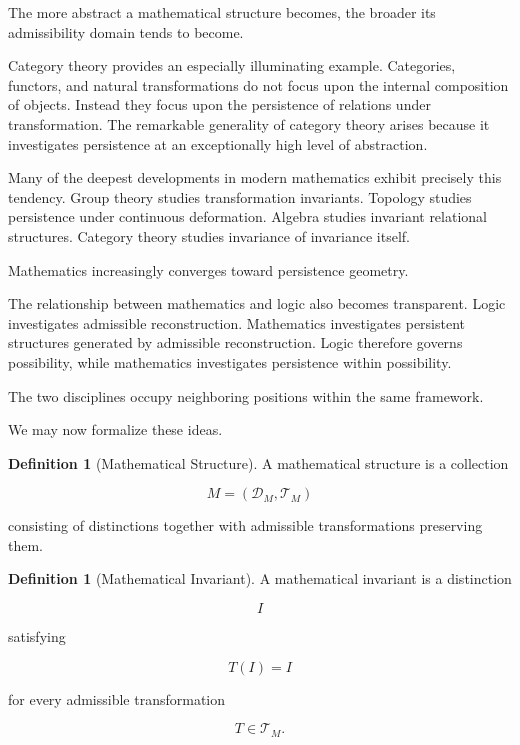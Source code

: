 \documentclass[12pt,oneside]{article}
\theoremstyle{definition}
\newtheorem{definition}[theorem]{Definition} \newtheorem{axiom}[theorem]{Axiom} \newtheorem{remark}[theorem]{Remark} \newtheorem{example}[theorem]{Example}
\begin{document}
The more abstract a mathematical structure becomes, the broader its admissibility domain tends to become.

Category theory provides an especially illuminating example. Categories, functors, and natural transformations do not focus upon the internal composition of objects. Instead they focus upon the persistence of relations under transformation. The remarkable generality of category theory arises because it investigates persistence at an exceptionally high level of abstraction.

Many of the deepest developments in modern mathematics exhibit precisely this tendency. Group theory studies transformation invariants. Topology studies persistence under continuous deformation. Algebra studies invariant relational structures. Category theory studies invariance of invariance itself.

Mathematics increasingly converges toward persistence geometry.

The relationship between mathematics and logic also becomes transparent. Logic investigates admissible reconstruction. Mathematics investigates persistent structures generated by admissible reconstruction. Logic therefore governs possibility, while mathematics investigates persistence within possibility.

The two disciplines occupy neighboring positions within the same framework.

We may now formalize these ideas.

\begin{definition}[Mathematical Structure]

A mathematical structure is a collection

\[
M
=
(\mathcal D_M,\mathcal T_M)
\]

consisting of distinctions together with admissible transformations preserving them.

\end{definition}

\begin{definition}[Mathematical Invariant]

A mathematical invariant is a distinction

\[
I
\]

satisfying

\[
T(I)
=
I
\]

for every admissible transformation

\[
T
\in
\mathcal T_M.
\]

\end{definition}
\end{document}
